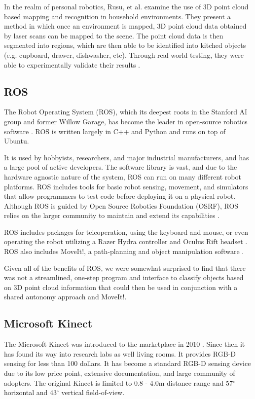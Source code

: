\documentclass{article}
\begin{document}
In the realm of personal robotics, Rusu, et al. examine the use of 3D point cloud based mapping and recognition in household environments. They present a method in which once an environment is mapped, 3D point cloud data obtained by laser scans can be mapped to the scene. The point cloud data is then segmented into regions, which are then able to be identified into kitched objects (e.g. cupboard, drawer, dishwasher, etc). Through real world testing, they were able to experimentally validate their results \cite{mapKitchen, mapHouse}. 

\subsection{ROS}
The Robot Operating System (ROS), which its deepest roots in the Stanford AI group and former Willow Garage, 
has become the leader in open-source robotics software \cite{ros, rospaper}. ROS is written largely in C++ and Python and runs on top of Ubuntu.  

It is used by hobbyists, researchers, and major industrial manufacturers, and has a large pool of active developers. The software library is vast, and due to the hardware agnostic nature of the system, ROS can run on many different robot platforms.  ROS includes tools for basic robot sensing, movement, and simulators that allow programmers to test code before deploying it on a physical robot. Although ROS is guided by Open Source Robotics Foundation (OSRF), ROS relies on the larger community to maintain and extend its capabilities \cite{ros, OSRF}.

ROS includes packages for teleoperation, using the keyboard and mouse, or even operating the robot utilizing a Razer Hydra controller and Oculus Rift headset \cite{surrogate}. ROS also includes MoveIt!, a path-planning and object manipulation software \cite{moveit}. 

Given all of the benefits of ROS, we were somewhat surprised to find that there was not a streamlined, one-step program and interface to classify objects based on 3D point cloud information that could then be used in conjunction with a shared autonomy approach and MoveIt!.

\subsection{Microsoft Kinect}
The Microsoft Kinect was introduced to the marketplace in 2010 \cite{kinectHistory}. Since then 
it has found its way into research labs as well living rooms.
It provides RGB-D sensing for less than 100 dollars. It has become a standard RGB-D
sensing device due to its low price point, extensive documentation, and large community of
adopters. The original Kinect is limited to 0.8 - 4.0m distance range and 57$^{\circ}$ horizontal 
and 43$^{\circ}$ vertical field-of-view. 
\end{document}
